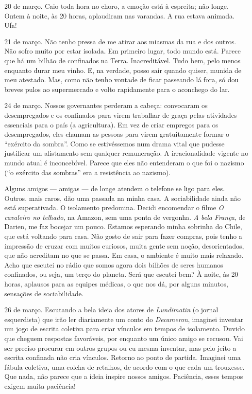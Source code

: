 20 de março. Caio toda hora no choro, a emoção está à espreita; não
longe. Ontem à noite, às 20 horas, aplaudiram nas varandas. A rua estava
animada. Ufa!

21 de março. Não tenho pressa de me atirar aos miasmas da rua e dos
outros. Não sofro muito por estar isolada. Em primeiro lugar, todo mundo
está. Parece que há um bilhão de confinados na Terra. Inacreditável.
Tudo bem, pelo menos enquanto durar meu vinho. E, na verdade, posso sair
quando quiser, munida de meu atestado. Mas, como não tenho vontade de
ficar passeando lá fora, só dou breves pulos ao supermercado e volto
rapidamente para o aconchego do lar.

24 de março. Nossos governantes perderam a cabeça: convocaram os
desempregados e os confinados para virem trabalhar de graça pelas
atividades essenciais para o país (a agricultura). Em vez de criar
empregos para os desempregados, eles chamam as pessoas para virem
gratuitamente formar o ``exército da sombra''. Como se estivéssemos num
drama vital que pudesse justificar um alistamento sem qualquer
remuneração. A irracionalidade vigente no mundo atual é inconcebível.
Parece que eles não entenderam o que foi o nazismo (``o exército das
sombras'' era a resistência ao nazismo).

Alguns amigos --- amigas --- de longe atendem o telefone se ligo para eles.
Outros, mais raros, dão uma passada na minha casa. A sociabilidade ainda
não está superativada. O isolamento predomina. Decidi encomendar o filme
\emph{O cavaleiro no telhado}, na Amazon, sem uma ponta de vergonha.
\emph{A bela França}, de Darien, me faz bocejar um pouco. Estamos
esperando minha sobrinha do Chile, que está voltando para casa. Não
gosto de sair para fazer compras, pois tenho a impressão de cruzar com
muitos curiosos, muita gente sem noção, desorientados, que não acreditam
no que se passa. Em casa, o ambiente é muito mais relaxado. Acho que
escutei no rádio que somos agora dois bilhões de seres humanos
confinados, ou seja, um terço do planeta. Será que escutei bem? À noite,
às 20 horas, aplausos para as equipes médicas, o que nos dá, por alguns
minutos, sensações de sociabilidade.

26 de março. Escutando a bela ideia dos atores de \emph{Lundimatin} (o
jornal esquerdista) que irão ler diariamente um conto do
\emph{Decameron}, imaginei inventar um jogo de escrita coletiva para
criar vínculos em tempos de isolamento. Duvido que cheguem respostas
favoráveis, por enquanto um único amigo se recusou. Vai ser preciso
procurar em outros grupos ou eu mesma inventar, mas pelo jeito a escrita
confinada não cria vínculos. Retorno ao ponto de partida. Imaginei uma
fábula coletiva, uma colcha de retalhos, de acordo com o que cada um
trouxesse. Que nada, não parece que a ideia inspire nossos amigos.
Paciência, esses tempos exigem muita paciência!


